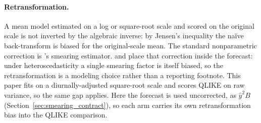 \paragraph{Retransformation.}
A mean model estimated on a log or square-root scale and scored on
the original scale is not inverted by the algebraic inverse: by
Jensen's inequality the na\"ive back-transform is biased for the
original-scale mean. The standard nonparametric correction is
\citet{Duan1983}'s smearing estimator. \citet{Manning1998} and
\citet{ManningMullahy2001} place that correction inside the forecast:
under heteroscedasticity a single smearing factor is itself biased, so
the retransformation is a modeling choice rather than a reporting
footnote. This paper fits on a diurnally-adjusted square-root scale
and scores QLIKE on raw variance, so the same gap applies. Here the
forecast is used uncorrected, as $\hat y^{2}B$
(Section~\ref{sec:smearing_contract}), so each arm carries its own
retransformation bias into the QLIKE comparison.

